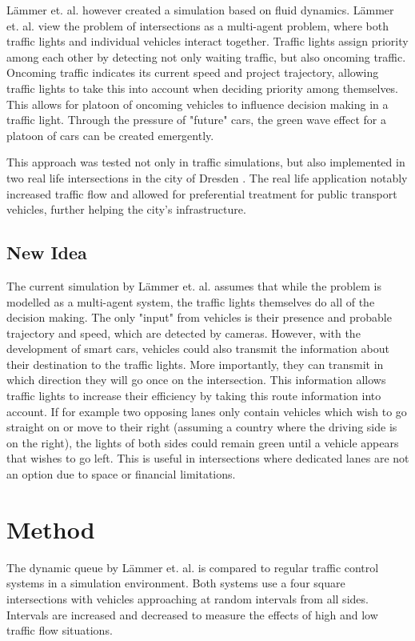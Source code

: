 \documentclass{article}
\begin{document}
L{\"a}mmer et. al. \cite{self_control2008} however created a simulation based on fluid dynamics.  L{\"a}mmer et. al. view the problem of intersections as a multi-agent problem, where both traffic lights and individual vehicles interact together. Traffic lights assign priority among each other by detecting not only waiting traffic, but also oncoming traffic. Oncoming traffic indicates its current speed and project trajectory, allowing traffic lights to take this into account when deciding priority among themselves. This allows for platoon of oncoming vehicles to influence decision making in a traffic light. Through the pressure of "future"  cars, the green wave effect for a platoon of cars can be created emergently.

This approach was tested not only in traffic simulations, but also implemented in two real life intersections in the city of Dresden \cite{site}. The real life application notably increased traffic flow and allowed for preferential treatment for public transport vehicles, further helping the city's infrastructure.


\subsection{New Idea}
The current simulation by L{\"a}mmer et. al. assumes that while the problem is modelled as a multi-agent system, the traffic lights themselves do all of the decision making. The only "input" from vehicles is their presence and probable trajectory and speed, which are detected by cameras. However, with the development of smart cars, vehicles could also transmit the information about their destination to the traffic lights. More importantly, they can transmit in which direction they will go once on the intersection. This information allows traffic lights to increase their efficiency by taking this route information into account. If for example two opposing lanes only contain vehicles which wish to go straight on or move to their right (assuming a country where the driving side is on the right), the lights of both sides could remain green until a vehicle appears that wishes to go left. This is useful in intersections where dedicated lanes are not an option due to space or financial limitations. 



\section{Method}
The dynamic queue by L{\"a}mmer et. al. is compared to regular traffic control systems in a simulation environment. Both systems use a four square intersections with vehicles approaching at random intervals from all sides. Intervals are increased and decreased to measure the effects of high and low traffic flow situations. 
\end{document}
